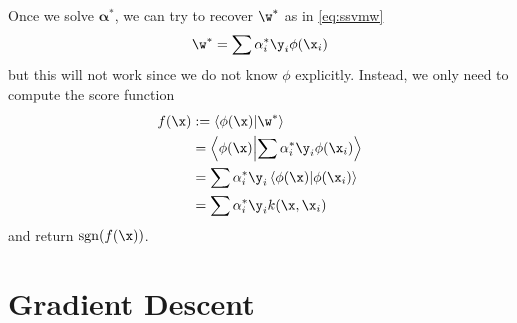 \documentclass[class=cs480,notes,tikz]{agony}
\begin{document}
Once we solve $\symbf\alpha^*$, we can try to recover $\w^*$ as in \cref{eq:ssvmw}
\[ \w^* = \sum \alpha_i^*\y_i \phi(\x_i) \]
but this will not work since we do not know $\phi$ explicitly.
Instead, we only need to compute the score function
\begin{align*}
  f(\x) & := \ip{\phi(\x)}{\w^*}                          \\
        & = \ip{\phi(\x)}{\sum \alpha_i^*\y_i \phi(\x_i)} \\
        & = \sum \alpha_i^*\y_i \ip{\phi(\x)}{\phi(\x_i)} \\
        & = \sum \alpha_i^*\y_i k(\x,\x_i)
\end{align*}
and return $\sgn(f(\x))$.

\section{Gradient Descent}\label{ch:gd}



\end{document}
